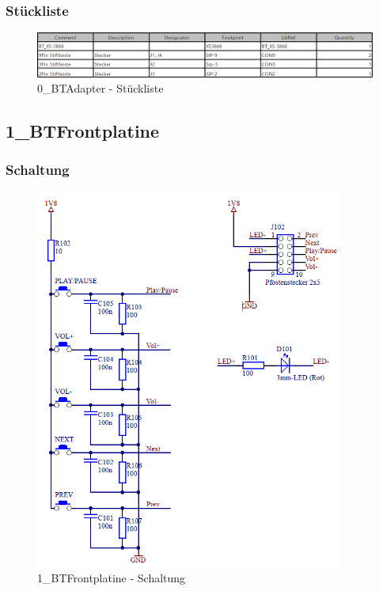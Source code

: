 \subsubsection*{Stückliste}
\begin{figure} [H]
	\centering
	\includegraphics[width=1\textwidth]{img/BTModul/adapter_Blist.png}
	\caption{0\_BTAdapter - Stückliste}
	\label {fig:8.10.3}
\end{figure}


\subsection{1\_BTFrontplatine}
\subsubsection*{Schaltung}
\begin{figure} [H]
	\centering
	\includegraphics[width=0.9\textwidth]{img/BTModul/front_sch.png}
	\caption{1\_BTFrontplatine - Schaltung}
	\label {fig:8.10.4}
\end{figure}

